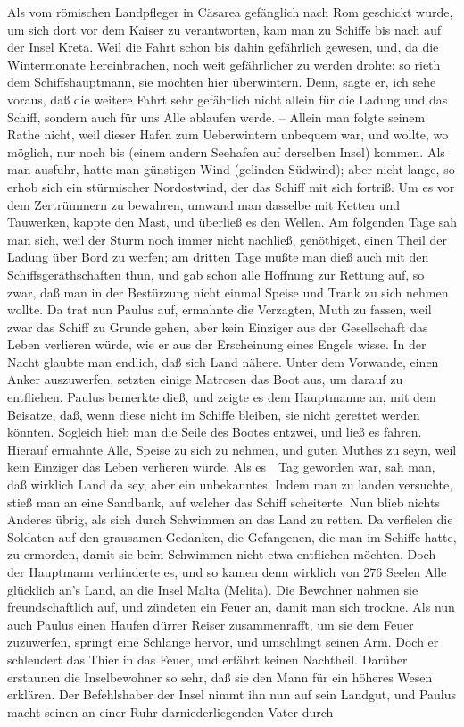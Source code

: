 \begin{aufza}
\item Als  vom römischen Landpfleger  in Cäsarea gefänglich nach Rom geschickt wurde, um sich dort vor dem Kaiser zu verantworten, kam man zu Schiffe bis nach  auf der Insel Kreta. Weil die Fahrt schon bis dahin gefährlich gewesen, und, da die Wintermonate hereinbrachen, noch weit gefährlicher zu werden drohte: so rieth  dem Schiffshauptmann, sie möchten hier überwintern. Denn, sagte er, ich sehe voraus, daß die weitere Fahrt sehr gefährlich nicht allein für die Ladung und das Schiff, sondern auch für uns Alle ablaufen werde. -- Allein man folgte seinem Rathe nicht, weil dieser Hafen zum Ueberwintern unbequem war, und wollte, wo möglich, nur noch bis  (einem andern Seehafen auf derselben Insel) kommen. Als man ausfuhr, hatte man günstigen Wind (gelinden Südwind); aber nicht lange, so erhob sich ein stürmischer Nordostwind, der das Schiff mit sich fortriß. Um es vor dem Zertrümmern zu bewahren, umwand man dasselbe mit Ketten und Tauwerken, kappte den Mast, und überließ es den Wellen. Am folgenden Tage sah man sich, weil der Sturm noch immer nicht nachließ, genöthiget, einen Theil der Ladung über Bord zu werfen; am dritten Tage mußte man dieß auch mit den Schiffsgeräthschaften thun, und gab schon alle Hoffnung zur Rettung auf, so zwar, daß man in der Bestürzung nicht einmal Speise und Trank zu sich nehmen wollte. Da trat nun Paulus auf, ermahnte die Verzagten, Muth zu fassen, weil zwar das Schiff zu Grunde gehen, aber kein Einziger aus der Gesellschaft das Leben verlieren würde, wie er aus der Erscheinung eines Engels wisse. In der Nacht glaubte man endlich, daß sich Land nähere. Unter dem Vorwande, einen Anker auszuwerfen, setzten einige Matrosen das Boot aus, um darauf zu entfliehen. Paulus bemerkte dieß, und zeigte es dem Hauptmanne an, mit dem Beisatze, daß, wenn diese nicht im Schiffe bleiben, sie nicht gerettet werden könnten. Sogleich hieb man die Seile des Bootes entzwei, und ließ es fahren. Hierauf ermahnte  Alle, Speise zu sich zu nehmen, und guten Muthes zu seyn, weil kein Einziger das Leben verlieren würde. Als es~\ Tag geworden war, sah man, daß wirklich Land da sey, aber ein unbekanntes. Indem man zu landen versuchte, stieß man an eine Sandbank, auf welcher das Schiff scheiterte. Nun blieb nichts Anderes übrig, als sich durch Schwimmen an das Land zu retten. Da verfielen die Soldaten auf den grausamen Gedanken, die Gefangenen, die man im Schiffe hatte, zu ermorden, damit sie beim Schwimmen nicht etwa entfliehen möchten. Doch der Hauptmann verhinderte es, und so kamen denn wirklich von 276 Seelen Alle glücklich an's Land, an die Insel Malta (Melita). Die Bewohner nahmen sie freundschaftlich auf, und zündeten ein Feuer an, damit man sich trockne. Als nun auch Paulus einen Haufen dürrer Reiser zusammenrafft, um sie dem Feuer zuzuwerfen, springt eine Schlange hervor, und umschlingt seinen Arm. Doch er schleudert das Thier in das Feuer, und erfährt keinen Nachtheil. Darüber erstaunen die Inselbewohner so sehr, daß sie den Mann für ein höheres Wesen erklären. Der Befehlshaber der Insel nimmt ihn nun auf sein Landgut, und Paulus macht seinen an einer Ruhr darniederliegenden Vater durch 
\end{aufza}
